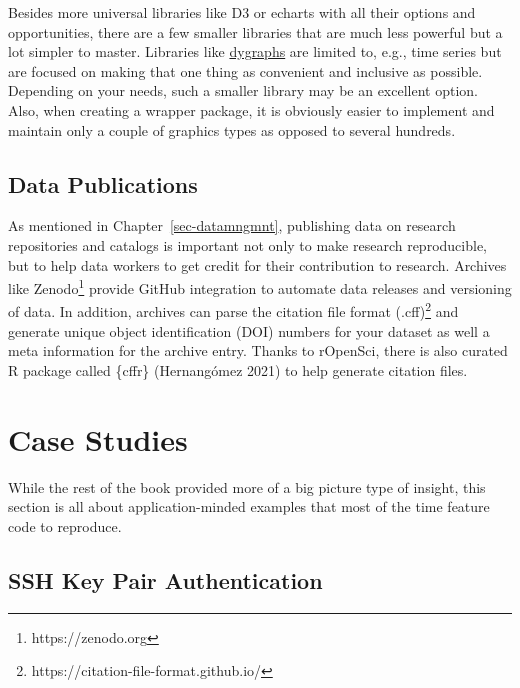 \documentclass[
  12pt,
  letterpaper,
]{krantz}
\begin{document}
Besides more universal libraries like D3 or echarts with all
their options and opportunities, there are a few smaller libraries that
are much less powerful but a lot simpler to master. Libraries like
\href{}{dygraphs} are limited to, e.g., time series
but are focused on making that one thing as convenient and inclusive as
possible. Depending on your needs, such a smaller library may be an
excellent option. Also, when creating a wrapper package, it is obviously
easier to implement and maintain only a couple of graphics types as
opposed to several hundreds.

\hypertarget{datapub}{%
\section{Data Publications}\label{datapub}}

As mentioned in Chapter~\ref{sec-datamngmnt}, publishing data on
research repositories and catalogs is important not only to make
research reproducible, but to help data workers to get credit for their
contribution to research. Archives like Zenodo\footnote{https://zenodo.org}
provide GitHub integration to automate data releases and versioning of
data. In addition, archives can parse the citation file format
(.cff)\footnote{https://citation-file-format.github.io/} and generate
unique object identification (DOI) numbers for your dataset as well a
meta information for the archive entry. Thanks to rOpenSci, there is
also curated R package called \{cffr\} (Hernangómez 2021) to help
generate citation files.


\hypertarget{case-studies}{%
\chapter{Case Studies}\label{case-studies}}

While the rest of the book provided more of a big
picture type of insight, this section is all about
application-minded examples that most of the time feature code to
reproduce.

\hypertarget{sec-rsa}{%
\section{SSH Key Pair Authentication}\label{sec-rsa}}
\end{document}
